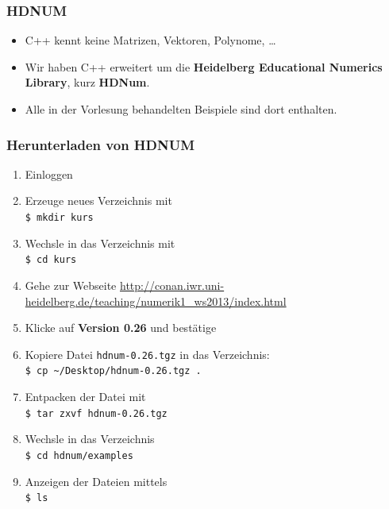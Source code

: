 \begin{frame}[fragile]
\frametitle{HDNUM}
\begin{itemize}
\item C++ kennt keine Matrizen, Vektoren, Polynome, \ldots
\item Wir haben C++ erweitert um die \textbf{Heidelberg Educational
  Numerics Library}, kurz \textbf{HDNum}.
\item Alle in der Vorlesung behandelten Beispiele sind dort
  enthalten.
\end{itemize}
\end{frame}

\begin{frame}
\frametitle{Herunterladen von HDNUM }
\begin{enumerate}
\item Einloggen
\item Erzeuge neues Verzeichnis mit \\ \lstinline{$ mkdir kurs}
\item Wechsle in das Verzeichnis mit \\ \lstinline{$ cd kurs}
\item Gehe zur Webseite
{\tiny\url{http://conan.iwr.uni-heidelberg.de/teaching/numerik1_ws2013/index.html}}
\item Klicke auf \textbf{Version 0.26} und bestätige
\item Kopiere Datei \lstinline{hdnum-0.26.tgz} in das Verzeichnis:
 \\ \lstinline{$ cp ~/Desktop/hdnum-0.26.tgz .} %
\item Entpacken der Datei mit \\ \lstinline{$ tar zxvf hdnum-0.26.tgz}
\item Wechsle in das Verzeichnis \\ \lstinline{$ cd hdnum/examples} %
\item Anzeigen der Dateien mittels\\ \lstinline{$ ls} %
\end{enumerate}
\end{frame}

